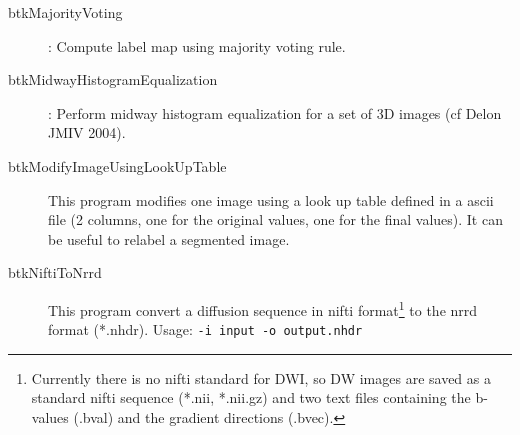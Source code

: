 \begin{description}
\item[btkMajorityVoting]: Compute label map using majority voting rule.
\item[btkMidwayHistogramEqualization]: Perform midway histogram equalization for a set of 3D images (cf Delon JMIV 2004).
\item[btkModifyImageUsingLookUpTable] This program modifies one image using a
look up table defined in a ascii file (2 columns, one for the original values,
one for the final values). It can be useful to relabel a segmented image. 

\item[btkNiftiToNrrd] This program convert a diffusion sequence in nifti
format\footnote{Currently there is no nifti standard for DWI, so DW images are
saved as a standard nifti sequence (*.nii, *.nii.gz) and two text files
containing the b-values (.bval) and the gradient directions (.bvec).}  to the
nrrd format (*.nhdr). Usage: \texttt{-i input -o output.nhdr}


\end{description}
